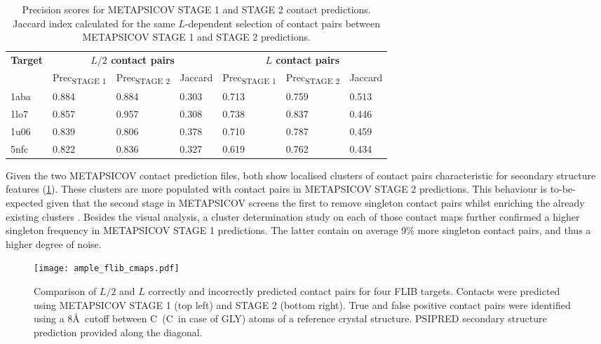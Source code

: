 \begin{table}[H]
  \centering
  \caption[Contact prediction summary for FLIB targets]{Precision scores for METAPSICOV \cite{Jones2015-vq} STAGE 1 and STAGE 2 contact predictions. Jaccard index calculated for the same $L$-dependent selection of contact pairs between METAPSICOV STAGE 1 and STAGE 2 predictions.}
  \label{table:ample_flib_contact_precision}
  \begin{tabularx}{\textwidth}{X X X X X X X}
      \hline
	  \multirow{2}{*}{\textbf{Target}} & \multicolumn{3}{c}{\textbf{$L/2$ contact pairs}} & \multicolumn{3}{c}{\textbf{$L$ contact pairs}} 	\\ \cline{2-7}
	  							&  	Prec\textsubscript{STAGE 1}	& 	Prec\textsubscript{STAGE 2}	& 	Jaccard 	& 	Prec\textsubscript{STAGE 1} 	& 	Prec\textsubscript{STAGE 2} 	& 	Jaccard	\\
	  \hline
	  1aba						&	0.884	&	0.884	&	0.303	&	0.713	&	0.759	&	0.513		\\
	  1lo7						&	0.857	&	0.957	&	0.308	&	0.738	&	0.837	&	0.446		\\
	  1u06						&	0.839	&	0.806	&	0.378	&	0.710	&	0.787	&	0.459		\\
	  5nfc						&	0.822	&	0.836	&	0.327	&	0.619	&	0.762	&	0.434		\\ 
	  \hline
  \end{tabularx}
\end{table}

Given the two METAPSICOV contact prediction files, both show localised clusters of contact pairs characteristic for secondary structure features (\cref{fig:ample_flib_cmaps}). These clusters are more populated with contact pairs in METAPSICOV STAGE 2 predictions. This behaviour is to-be-expected given that the second stage in METAPSICOV screens the first to remove singleton contact pairs whilst enriching the already existing clusters \cite{Jones2015-vq}. Besides the visual analysis, a cluster determination study on each of those contact maps further confirmed a higher singleton frequency in METAPSICOV STAGE 1 predictions. The latter contain on average 9\% more singleton contact pairs, and thus a higher degree of noise.

\begin{figure}[H]
	\centering
	\texttt{[image: ample\_flib\_cmaps.pdf]}
	\caption[Contact map comparison for FLIB targets]{Comparison of $L/2$ and $L$ correctly and incorrectly predicted contact pairs for four FLIB targets. Contacts were predicted using METAPSICOV \cite{Jones2015-vq} STAGE 1 (top left) and STAGE 2 (bottom right). True and false positive contact pairs were identified using a 8\AA\ cutoff between C\textalpha\ (C\textbeta\ in case of GLY) atoms of a reference crystal structure. PSIPRED \cite{Jones1999-ed} secondary structure prediction provided along the diagonal.}
	\label{fig:ample_flib_cmaps}
\end{figure}

